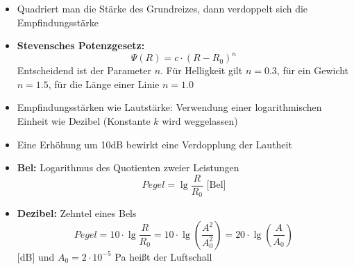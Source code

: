 \documentclass[12pt,landscape]{article}
\begin{document}
\begin{multicols}{3}
\begin{itemize}
\item Quadriert man die Stärke des Grundreizes, dann verdoppelt sich die Empfindungsstärke
\item \textbf{Stevensches Potenzgesetz:} \[\Psi(R) = c \cdot (R - R_0)^n\]Entscheidend ist der Parameter $n$. Für Helligkeit gilt $n = 0.3$, für ein Gewicht $n = 1.5$, für die Länge einer Linie $n = 1.0$
\item Empfindungsstärken wie Lautstärke: Verwendung einer logarithmischen Einheit wie Dezibel (Konstante $k$ wird weggelassen)
\item Eine Erhöhung um 10dB bewirkt eine Verdopplung der Lautheit
\item \textbf{Bel:} Logarithmus des Quotienten zweier Leistungen \[Pegel = \lg \frac{R}{R_0} \text{ [Bel]}\]
\item \textbf{Dezibel:} Zehntel eines Bels  \[Pegel=10 \cdot \lg \frac{R}{R_0} =10 \cdot \lg\left(\frac{A^2}{A_0^2}\right)=20 \cdot \lg\left(\frac{A}{A_0}\right)\] [dB] und $A_0=2\cdot10^{-5}$ Pa heißt der Luftschall
\end{itemize}

\end{multicols}
\end{document}
